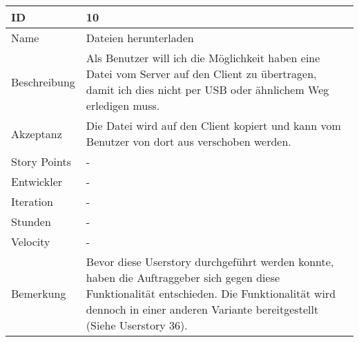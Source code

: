 \begin{table}[htbp]
    \begin{minipage}{\linewidth}
        \setlength{\tymax}{0.5\linewidth}
        \centering
        \small
        \begin{tabulary}{\textwidth}{|l|p{10cm}|} \hline
            ID   &10\\\hline
            Name  &Dateien herunterladen\\\hline
            Beschreibung&Als Benutzer will ich die Möglichkeit haben eine Datei vom Server auf den Client zu übertragen, damit ich dies nicht per USB oder ähnlichem Weg erledigen muss.\\\hline
            Akzeptanz &Die Datei wird auf den Client kopiert und kann vom Benutzer von dort aus verschoben werden.\\\hline
            Story Points&-\\\hline
            Entwickler &-\\\hline
            Iteration &-\\\hline
            Stunden  &-\\\hline
            Velocity &-\\\hline
            Bemerkung & Bevor diese Userstory durchgeführt werden konnte, haben die Auftraggeber sich gegen diese Funktionalität entschieden. Die Funktionalität wird dennoch in einer anderen Variante bereitgestellt (Siehe Userstory 36). \\\hline
        \end{tabulary}
    \end{minipage}
\end{table}



